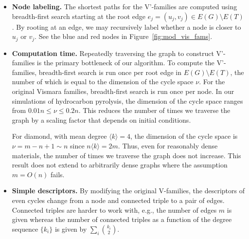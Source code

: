 \documentclass[fleqn,11pt]{article}
\begin{document}
\begin{itemize}
	\item \textbf{Node labeling.} The shortest paths for the V'-families are computed using breadth-first search starting at the root edge $e_j=(u_j,v_j)\in E(G)\setminus E(T)$. By rooting at an edge, we may recursively label whether a node is closer to $u_j$ or $v_j$. %
	See the blue and red nodes in Figure~\ref{fig:mod_vis_fams}.
	
	\item \textbf{Computation time.} 
	Repeatedly traversing the graph to construct V'-families is the primary bottleneck of our algorithm.
	To compute the V'-families, breadth-first search is run once per root edge in $E(G)\setminus E(T)$, the number of which is equal to the dimension of the cycle space $\nu$. 
	For the original Vismara families, breadth-first search is run once per node. 
	In our simulations of hydrocarbon pyrolysis, the dimension of the cycle space ranges from $0.01 n \le \nu \le 0.2 n$. 
	This reduces the number of times we traverse the graph by a scaling factor that depends on initial conditions.
	 
	For diamond, with mean degree $\langle k\rangle=4$, the dimension of the cycle space is $\nu = m - n + 1 \sim n$ since $n\langle k\rangle = 2m$. Thus, even for reasonably dense materials, the number of times we traverse the graph does not increase. This result does not extend to arbitrarily dense graphs where the assumption $m=O(n)$ fails.
	
	\item \textbf{Simple descriptors.} 
	By modifying the original V-families, the descriptors of even cycles change from a node and connected triple to a pair of edges. Connected triples are harder to work with, e.g.,
	the number of edges $m$ is given whereas the number of connected triples as a function of the degree sequence $\{k_i\}$ is given by $\sum_i \binom{k_i}{2}$.
\end{itemize}
\end{document}
